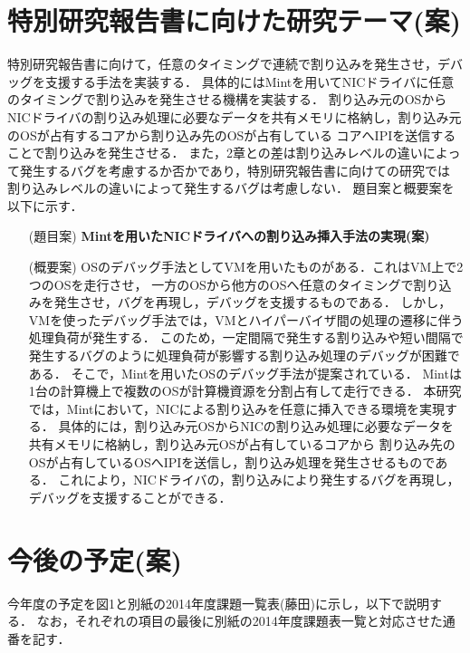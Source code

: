 \documentclass[12pt]{jsarticle}
\begin{document}
\section{特別研究報告書に向けた研究テーマ(案)}
特別研究報告書に向けて，任意のタイミングで連続で割り込みを発生させ，デバッグを支援する手法を実装する．
具体的にはMintを用いてNICドライバに任意のタイミングで割り込みを発生させる機構を実装する．
割り込み元のOSからNICドライバの割り込み処理に必要なデータを共有メモリに格納し，割り込み元のOSが占有するコアから割り込み先のOSが占有している
コアへIPIを送信することで割り込みを発生させる．
また，2章との差は割り込みレベルの違いによって発生するバグを考慮するか否かであり，特別研究報告書に向けての研究では
割り込みレベルの違いによって発生するバグは考慮しない．
題目案と概要案を以下に示す．
\begin{itemize}
\item[(題目案)] {\bf Mintを用いたNICドライバへの割り込み挿入手法の実現(案)}
\item[(概要案)] OSのデバッグ手法としてVMを用いたものがある．これはVM上で2つのOSを走行させ，
一方のOSから他方のOSへ任意のタイミングで割り込みを発生させ，バグを再現し，デバッグを支援するものである．
しかし，VMを使ったデバッグ手法では，VMとハイパーバイザ間の処理の遷移に伴う処理負荷が発生する．
このため，一定間隔で発生する割り込みや短い間隔で発生するバグのように処理負荷が影響する割り込み処理のデバッグが困難である．
そこで，Mintを用いたOSのデバッグ手法が提案されている．
Mintは1台の計算機上で複数のOSが計算機資源を分割占有して走行できる．
本研究では，Mintにおいて，NICによる割り込みを任意に挿入できる環境を実現する．
具体的には，割り込み元OSからNICの割り込み処理に必要なデータを共有メモリに格納し，割り込み元OSが占有しているコアから
割り込み先のOSが占有しているOSへIPIを送信し，割り込み処理を発生させるものである．
これにより，NICドライバの，割り込みにより発生するバグを再現し，デバッグを支援することができる．

\end{itemize}



\section{今後の予定(案)}
今年度の予定を図1と別紙の2014年度課題一覧表(藤田)に示し，以下で説明する．
なお，それぞれの項目の最後に別紙の2014年度課題表一覧と対応させた通番を記す．
\end{document}
